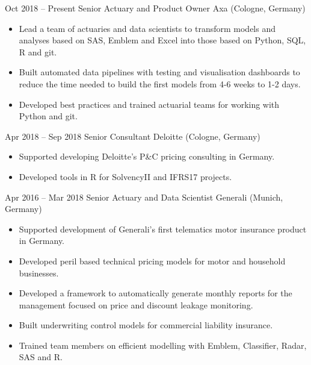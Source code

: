 \documentclass[a4paper,]{fortysecondscv}
\begin{document}
\begin{cvtable}[2.5]
		\cvitem
			{Oct 2018 -- Present}
			{Senior Actuary and Product Owner}
			{Axa (Cologne, Germany)}
			{
				\vspace{-\topsep}
				\begin{itemize}[nosep, leftmargin=0pt] %
					\item Lead a team of actuaries and data scientists to transform models and analyses based on SAS, Emblem and Excel into those based on Python, SQL, R and git.
					\item Built automated data pipelines with testing and visualisation dashboards to reduce the time needed to build the first models from 4-6 weeks to 1-2 days.
					\item Developed best practices and trained actuarial teams for working with Python and git.
				\end{itemize}
			}
		\cvitem
			{Apr 2018 -- Sep 2018}
			{Senior Consultant}
			{Deloitte (Cologne, Germany)}
			{
				\vspace{-\topsep}
				\begin{itemize}[nosep, leftmargin=0pt] %
  					\item Supported developing Deloitte's P\&C pricing consulting in Germany.
  					\item Developed tools in R for SolvencyII and IFRS17 projects.
				\end{itemize}
			}
		\cvitem
			{Apr 2016 -- Mar 2018}
			{Senior Actuary and Data Scientist}
			{Generali (Munich, Germany)}
			{				
				\vspace{-\topsep}
				\begin{itemize}[nosep, leftmargin=0pt] %
					\item Supported development of Generali’s first telematics motor insurance product in Germany.
					\item Developed peril based technical pricing models for motor and household businesses.
					\item Developed a framework to automatically generate monthly reports for the management focused on price and discount leakage monitoring.
					\item Built underwriting control models for commercial liability insurance.
					\item Trained team members on efficient modelling with Emblem, Classifier, Radar, SAS and R.

\end{itemize}}
\end{cvtable}
\end{document}
